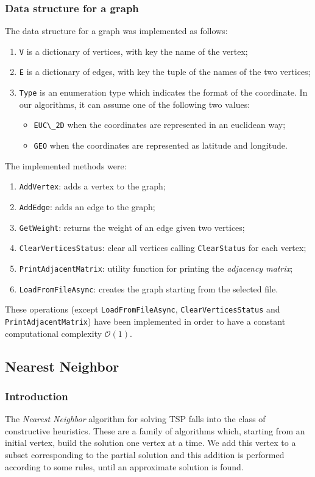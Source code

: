 \subsubsection{Data structure for a graph}
The data structure for a graph was implemented as follows:
\begin{enumerate}
    \item \verb|V| is a dictionary of vertices, with key the name of the vertex;
    \item \verb|E| is a dictionary of edges, with key the tuple of the names of the two vertices;
    \item \verb|Type| is an enumeration type which indicates the format of the coordinate. In our algorithms, it can assume one of the following two values:
    \begin{itemize}
        \item \verb|EUC\_2D| when the coordinates are represented in an euclidean way;
        \item \verb|GEO| when the coordinates are represented as latitude and longitude.
    \end{itemize}
\end{enumerate}
\noindent
The implemented methods were:
\begin{enumerate}
    \item \verb|AddVertex|: adds a vertex to the graph;
    \item \verb|AddEdge|: adds an edge to the graph;
    \item \verb|GetWeight|: returns the weight of an edge given two vertices;
    \item \verb|ClearVerticesStatus|: clear all vertices calling \verb|ClearStatus| for each vertex;
    \item \verb|PrintAdjacentMatrix|: utility function for printing the \textit{adjacency matrix};
    \item \verb|LoadFromFileAsync|: creates the graph starting from the selected file.
\end{enumerate}
These operations (except \verb|LoadFromFileAsync|, \verb|ClearVerticesStatus| and \verb|PrintAdjacentMatrix|) have been implemented in order to have a constant computational complexity $\mathcal{O}(1)$.

\subsection{Nearest Neighbor}

\subsubsection{Introduction}
The \textit{Nearest Neighbor} algorithm for solving TSP falls into the class of constructive heuristics. These are a family of algorithms which, starting from an initial vertex, build the solution one vertex at a time. We add this vertex to a subset corresponding to the partial solution and this addition is performed according to some rules, until an approximate solution is found.

